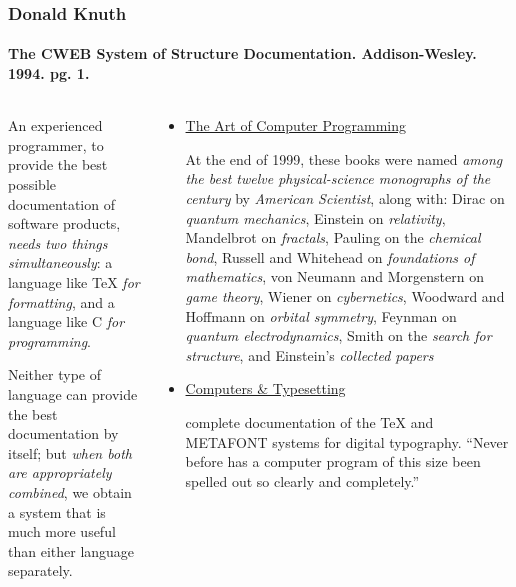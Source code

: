 \documentclass{beamer}
\begin{document}
\begin{frame}[fragile]
  \frametitle{Donald Knuth}
  \framesubtitle{The CWEB System of Structure Documentation. Addison-Wesley. 1994. pg. 1.}
  \footnotesize

\begin{columns}
	\begin{column}{4.5cm}
An experienced programmer, to provide the best possible documentation of software products, \emph{needs two things simultaneously}: \alert{a language like TeX} \emph{for formatting}, and \alert{a language like C} \emph{for programming}. 

\vspace{10mm}
Neither type of language can provide the best documentation by itself; but \emph{when both are appropriately combined}, we obtain a system that is much more useful than either language separately.	
	\end{column}
\pause\hspace{-0.5cm}
	\begin{column}{8cm}
\begin{itemize}
\item \href{http://www-cs-faculty.stanford.edu/~knuth/taocp.html}{\alert{The Art of Computer Programming}}

{\scriptsize
At the end of 1999, these books were named \emph{among the best twelve physical-science monographs of the century} by {\it American Scientist}, along with: Dirac on {\it quantum mechanics}, Einstein on {\it relativity}, Mandelbrot on {\it fractals}, Pauling on the {\it chemical bond}, Russell and Whitehead on {\it foundations of mathematics}, von Neumann and Morgenstern on {\it game theory}, Wiener on {\it cybernetics}, Woodward and Hoffmann on {\it orbital symmetry}, Feynman on {\it quantum electrodynamics}, Smith on the {\it search for structure}, and Einstein's {\it collected papers}
}

\item \href{http://www.amazon.com/Computers-Typesetting-Volumes-A-E-Boxed/dp/0201734168/ref=sr_1_1?ie=UTF8&qid=1385620263&sr=8-1}{\alert{Computers \& Typesetting}}

{\scriptsize
complete documentation of the TeX and METAFONT systems for digital typography.
``Never before has a computer program of this size been spelled out so clearly and completely.''
}

\end{itemize}
	

	\end{column}
\end{columns}

\end{frame}
\end{document}
